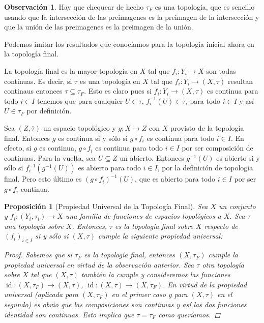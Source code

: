\documentclass[12pt]{book}
\newtheorem{prop}[teo]{Proposición}
\theoremstyle{definition}
\newtheorem{obs}[teo]{Observación}
\DeclareMathOperator{\id}{id}
\begin{document}
\begin{obs}
Hay que chequear de hecho $\tau_F$ es una topología, que es sencillo usando que la intersección de las preimagenes es la preimagen de la intersección y que la unión de las preimagenes es la preimagen de la unión.

Podemos imitar los resultados que conocíamos para la topología inicial ahora en la topología final.

La topología final es la mayor topología en $X$ tal que $f_i:Y_i\to X$ son todas continuas. Es decir, si $\tau$ es una topología en $X$ tal que $f_i:Y_i\to (X,\tau)$ resultan continaus entonces $\tau\subseteq\tau_F$. Esto es claro pues si $f_i:Y_i\to (X,\tau)$ es continua para todo $i\in I$ tenemos que para cualquier $U\in\tau$, $f_i^{-1}(U) \in\tau_i$ para todo $i\in I$ y así $U\in \tau_F$ por definición.

Sea $(Z,\overline{\tau})$ un espacio topológico y $g:X\to Z$ con $X$ provisto de la topología final. Entonces $g$ es continua si y sólo si $g\circ f_i$ es continua para todo $i\in I$. En efecto, si $g$ es continua, $g\circ f_i$ es continua para todo $i\in I$ por ser composición de continuas. Para la vuelta, sea $U\subseteq Z$ un abierto. Entonces $g^{-1}(U)$ es abierto si y sólo si $f_i^{-1}(g^{-1}(U))$ es abierto para todo $i\in I$, por la definición de topología final. Pero esto último es $(g\circ f_i)^{-1}(U)$, que es abierto para todo $i\in I$ por ser $g\circ f_i$ continua.
\end{obs}

\begin{prop}[Propiedad Universal de la Topología Final]
Sea $X$ un conjunto y $f_i:(Y_i,\tau_i)\to X$ una familia de funciones de espacios topológicos a $X$. Sea $\tau$ una topología sobre $X$. Entonces, $\tau$ es la topología final sobre $X$ respecto de $(f_i)_{i\in I}$ si y sólo si $(X,\tau)$ cumple la siguiente propiedad universal:

\begin{center}
\end{center}
\begin{proof}
Sabemos que si $\tau_F$ es la topología final, entonces $(X,\tau_F)$ cumple la propiedad universal en virtud de la observación anterior. Sea $\tau$ otra topología sobre $X$ tal que $(X,\tau)$ también la cumple y consideremos las funciones $\id: (X,\tau_F)\to (X,\tau)$, $\id:(X,\tau)\to (X,\tau_F)$. En virtud de la propiedad universal (aplicada para $(X,\tau_F)$ en el primer caso y para $(X,\tau)$ en el segundo) es obvio que las composiciones son continuas y así las dos funciones identidad son continuas. Esto implica que $\tau =\tau_F$ como queríamos.
\end{proof}
\end{prop}
\end{document}
